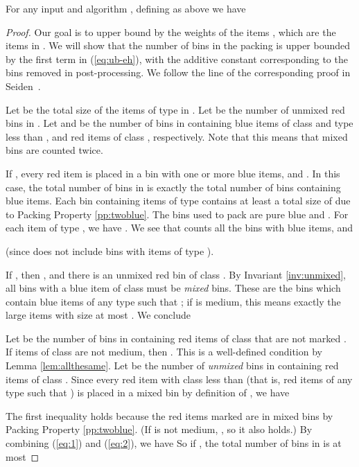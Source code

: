 \begin{theorem}
	\label{thm:ub-eh}
	For any input  and {\EHarm} algorithm , defining  as above we have
	
\end{theorem}
\begin{proof}
	Our goal is to upper bound  by the weights of the items , which
	are the items in . 
	We will show that the number of bins in the packing  is upper bounded by the first term in 
	(\ref{eq:ub-eh}), with the additive constant  corresponding to the bins removed in post-processing.
	We follow the line of the corresponding proof in Seiden~\cite{Seiden02}.
	
	Let  be the total size of the items of type  in .
	Let  be the number of unmixed red bins in .
	Let  and  be the number of bins in 
	containing blue items of class  and type less than , and red items of class , respectively. 
	Note that this means that mixed bins are counted twice.
	
	If , every red item is placed in a bin with one or more blue items, and . In this case,
	the total number of bins in  is exactly the total number of bins containing blue items.
	Each bin containing items of type  contains at least a total size of 
	due to Packing Property \ref{pp:twoblue}.
	The bins used to pack  are pure blue and . 
For each item  	of type , we have
	. We see that  counts all the bins with blue items, and
	
	(since  does not include bins with items of type ).




	If , then , and there is an unmixed red bin of class .
	By Invariant \ref{inv:unmixed}, all bins with a blue item of class  must be \emph{mixed} bins.
	These are the bins which contain blue items of any type  such that ;
	if  is medium, this means exactly the large items with size at most .
	We conclude
	
	Let  be the number of bins in  containing 
	red items of class  that are not marked .
	If items of class  are not medium, then .
	This is a well-defined condition by Lemma \ref{lem:allthesame}.
	Let  be the number of \emph{unmixed} bins in  containing red items of class .
	Since every red item with class less than  (that is, red items of any type  such that )
	is placed in a mixed bin by definition of , we have
	
	The first inequality holds because the red items marked  are in {mixed} bins by Packing Property \ref{pp:twoblue}.	
	(If  is not medium, , so it also holds.)
	By combining (\ref{eq:1}) and (\ref{eq:2}), we have
So if ,	the total number of bins in  is at most
	

\end{proof}
